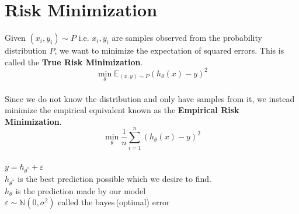 \documentclass[12pt,a4paper,titlepage,landscape]{book}
\begin{document}
	\section{Risk Minimization}
	Given $(x_i, y_i)\sim P$ i.e. $x_i, y_i$ are samples observed from the probability distribution $P$, we want to minimize the expectation of squared errors. This is called the \textbf{True Risk Minimization}.
	$$\min\limits_{\theta}\mathbb{E}_{(x,y)\sim{P}} (h_\theta(x)-y)^2$$ \\
	Since we do not know the distribution and only have samples from it, we instead minimize the empirical equivalent known as the \textbf{Empirical Risk Minimization}.
	$$\min\limits_{\theta} \dfrac{1}{n} \sum_{i=1}^{n} (h_\theta(x)-y)^2$$ \\
	$y = h_{\theta^*}+\varepsilon$\\
	$h_{\theta^*}$ is the best prediction possible which we desire to find. \\
	$h_{\theta}$ is the prediction made by our model \\
	$\varepsilon \sim \mathbb{N}(0, \sigma^2)$ called the bayes\,(optimal) error\\
	
\end{document}
